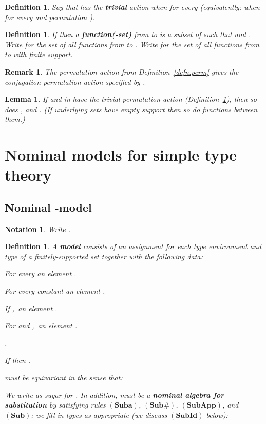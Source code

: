 \documentclass[submission,copyright]{eptcs}
\newtheorem{lemm}[thrm]{Lemma}
\newtheorem{nttn}[thrm]{Notation}
\newtheorem{defn}[thrm]{Definition}
\newtheorem{rmrk}[thrm]{Remark}
\newcommand{\deffont}[1]{\textbf{#1}}
\newcommand{\rulefont}[1]{\ensuremath{(\mathbf{#1})}}
\begin{document}
\begin{defn}
\label{defn.triv}
Say that  has the \deffont{trivial} action when  for every  (equivalently: when  for every  and permutation ).
\end{defn}

\begin{defn}
If  then a \deffont{function(-set)} from  to  is a subset of  such that  and .
Write  for the set of all functions from  to .
Write  for the set of all functions from  to  with finite support.
\end{defn}

\begin{rmrk}
The permutation action from Definition~\ref{defn.perm} gives  the \emph{conjugation} permutation action specified by .
\end{rmrk}

\begin{lemm}
\label{lemm.triv.func}
If  and  in  have the trivial permutation action (Definition~\ref{defn.triv}), then so does , and . 
(If underlying sets have empty support then so do functions between them.) 
\end{lemm}

\section{Nominal models for simple type theory}
\label{sect.nominal.models}
\subsection{Nominal -model}
\label{subsect.lambda.model}

\begin{nttn}
\label{nttn.pi.Gamma}
Write . 
\end{nttn}

\begin{defn}
\label{defn.lambda.model}
A \deffont{model}  consists of an assignment for each type environment  and type  of a finitely-supported set  together with the following data:
\begin{enumerate*}
\item
For every  an element .
\item
For every constant  an element .
\item
If ,\ an element .
\item
For  and ,\ an element .
\item
.
\item
\label{item.subset.condition}
If  then .
\end{enumerate*}
 must be \emph{equivariant} in the sense that:

We write  as sugar for . 
In addition,  must be a \deffont{nominal algebra for substitution} by satisfying rules \rulefont{Suba}, \rulefont{Sub\#}, \rulefont{SubApp}, and \rulefont{Sub\text{}}; we fill in types as appropriate (we discuss \rulefont{SubId} below):

\end{defn}
\end{document}
